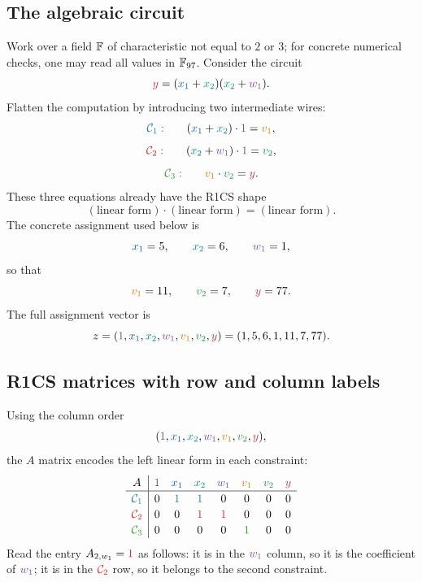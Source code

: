 \subsection{The algebraic circuit}

Work over a field $\mathbb{F}$ of characteristic not equal to $2$ or $3$; for concrete numerical checks, one may read all values in $\mathbb{F}_{97}$. Consider the circuit
\[
    \ywire{y}=(\xone{x_1}+\xtwo{x_2})(\xtwo{x_2}+\wone{w_1}).
\]
Flatten the computation by introducing two intermediate wires:
\[
    \rowone{\mathcal C_1:}\qquad
    (\xone{x_1}+\xtwo{x_2})\cdot \constwire{1}=\vone{v_1},
\]
\[
    \rowtwo{\mathcal C_2:}\qquad
    (\xtwo{x_2}+\wone{w_1})\cdot \constwire{1}=\vtwo{v_2},
\]
\[
    \rowthree{\mathcal C_3:}\qquad
    \vone{v_1}\cdot\vtwo{v_2}=\ywire{y}.
\]
These three equations already have the R1CS shape
\[
    (\text{linear form})\cdot(\text{linear form})=(\text{linear form}).
\]
The concrete assignment used below is
\[
    \xone{x_1}=5,
    \qquad
    \xtwo{x_2}=6,
    \qquad
    \wone{w_1}=1,
\]
so that
\[
    \vone{v_1}=11,
    \qquad
    \vtwo{v_2}=7,
    \qquad
    \ywire{y}=77.
\]
The full assignment vector is
\[
    z=(\constwire{1},\xone{x_1},\xtwo{x_2},\wone{w_1},\vone{v_1},\vtwo{v_2},\ywire{y})
      =(1,5,6,1,11,7,77).
\]

\subsection{R1CS matrices with row and column labels}

Using the column order
\[
    (\constwire{1},\xone{x_1},\xtwo{x_2},\wone{w_1},\vone{v_1},\vtwo{v_2},\ywire{y}),
\]
the $A$ matrix encodes the left linear form in each constraint:
\[
\renewcommand{\arraystretch}{1.15}
\begin{array}{c|ccccccc}
A & \constwire{1} & \xone{x_1} & \xtwo{x_2} & \wone{w_1} & \vone{v_1} & \vtwo{v_2} & \ywire{y} \\
\hline
\rowone{\mathcal C_1} & 0 & \rowone{1} & \rowone{1} & 0 & 0 & 0 & 0 \\
\rowtwo{\mathcal C_2} & 0 & 0 & \rowtwo{1} & \rowtwo{1} & 0 & 0 & 0 \\
\rowthree{\mathcal C_3} & 0 & 0 & 0 & 0 & \rowthree{1} & 0 & 0
\end{array}
\]
Read the entry $A_{2,w_1}=\rowtwo{1}$ as follows: it is in the $\wone{w_1}$ column, so it is the coefficient of $\wone{w_1}$; it is in the $\rowtwo{\mathcal C_2}$ row, so it belongs to the second constraint.


